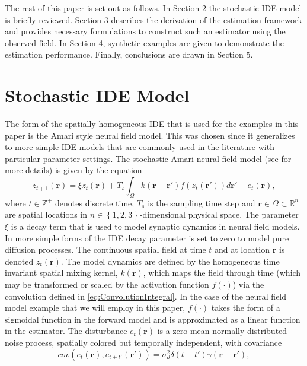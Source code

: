 \documentclass[10pt,twocolumn,twoside]{IEEEtran}
\begin{document}
The rest of this paper is set out as follows. In Section 2 the stochastic IDE model is briefly reviewed. Section 3 describes the derivation of the estimation framework and provides necessary formulations to construct such an estimator using the observed field. In Section 4, synthetic examples are given to demonstrate the estimation performance. Finally, conclusions are drawn in Section 5.

\section{Stochastic IDE Model}
The form of the spatially homogeneous IDE that is used for the examples in this paper is the Amari style neural field model. This was chosen since it generalizes to more simple IDE models that are commonly used in the literature with particular parameter settings. The stochastic Amari neural field model (see \cite{Freestone2011} for more details) is given by the equation  
\begin{equation}
 z_{t+1}\left(\mathbf{r}\right)=\xi z_t(\mathbf{r})+T_s\int_{\Omega}k\left(\mathbf{r}-\mathbf{r}'\right)f(z_{t}\left(\mathbf{r}'\right))d\mathbf{r}'+e_{t}\left(\mathbf{r}\right),
\label{eq:ConvolutionIntegral}
\end{equation}
where $t\in \mathbb{Z}^{+} $ denotes discrete time, $T_s$ is the sampling time step and $\mathbf{r} \in \Omega \subset \mathbb{R}^{n}$ are spatial locations in $n \in \left\lbrace 1,2,3 \right\rbrace $-dimensional physical space. The parameter $\xi$ is a decay term that is used to model synaptic dynamics in neural field models. In more simple forms of the IDE decay parameter is set to zero to model pure diffusion processes. The continuous spatial field at time $t$ and at location $\mathbf r$ is denoted $z_t\left(\mathbf r\right)$. The model dynamics are defined by the homogeneous time invariant spatial mixing kernel, $k\left(\mathbf{r}\right)$, which maps the field through time (which may be transformed or scaled by the activation function $f(\cdot)$) via the convolution defined in \eqref{eq:ConvolutionIntegral}. In the case of the neural field model example that we will employ in this paper, $f(\cdot)$ takes the form of a sigmoidal function in the forward model and is approximated as a linear function in the estimator. The disturbance $e_{t}(\mathbf{r})$ is a zero-mean normally distributed noise process, spatially colored but temporally independent, with covariance \cite{Rasmussen2005}
\begin{equation}
cov\left(e_{t}\left(\mathbf{r}\right),e_{t+t'}\left(\mathbf{r'}\right)\right)=\sigma_d^2\delta(t-t')\gamma(\mathbf{r}-\mathbf{r'}),
\label{eq:FieldDisturbance}
\end{equation}
\end{document}
